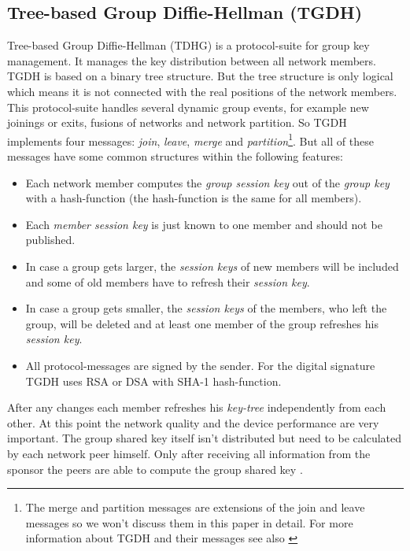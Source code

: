 \subsection{Tree-based Group Diffie-Hellman (TGDH)}\label{sec:TGDH}
Tree-based Group Diffie-Hellman (TDHG) is a protocol-suite for group key management. It manages the key distribution between all network members. TGDH is based on a binary tree structure. But the tree structure is only logical which means it is not connected with the real positions of the network members. This protocol-suite handles several dynamic group events, for example new joinings or exits, fusions of networks and network partition. So TGDH implements four messages: \textsl{join}, \textsl{leave}, \textsl{merge} and \textsl{partition}\footnote{The merge and partition messages are extensions of the join and leave messages so we won't discuss them in this paper in detail. For more information about TGDH and their messages see also \citep{Liao2004}}. But all of these messages have some common structures within the following features:
\begin{itemize}
  \item Each network member computes the \textsl{group session key} out of the \textsl{group key} with a hash-function (the hash-function is the same for all members).
  \item Each \textsl{member session key} is just known to one member and should not be published.
  \item In case a group gets larger, the \textsl{session keys} of new members will be included and some of old members have to refresh their \textsl{session key}.
  \item In case a group gets smaller, the \textsl{session keys} of the members, who left the group, will be deleted and at least one member of the group refreshes his \textsl{session key}.
  \item All protocol-messages are signed by the sender. For the digital signature TGDH uses RSA or DSA with SHA-1 hash-function. 
\end{itemize}
After any changes each member refreshes his \textsl{key-tree} independently from each other. At this point the network quality and the device performance are very important. The group shared key itself isn't distributed but need to be calculated by each network peer himself. Only after receiving all information from the sponsor the peers are able to compute the group shared key \citep{Liao2004}.\\

